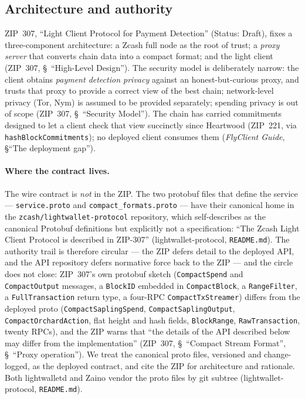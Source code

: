 \documentclass[11pt,a4paper]{article}
\theoremstyle{definition}
\begin{document}
\subsection{Architecture and authority}\label{sec:sync-authority}

ZIP~307, ``Light Client Protocol for Payment Detection'' (Status: Draft),
fixes a three-component architecture: a Zcash full node as the root of
trust; a \emph{proxy server} that converts chain data into a compact
format; and the light client (ZIP~307, \S~``High-Level Design''). The
security model is deliberately narrow: the client obtains \emph{payment
detection privacy} against an honest-but-curious proxy, and trusts that
proxy to provide a correct view of the best chain; network-level privacy
(Tor, Nym) is assumed to be provided separately; spending privacy is out of
scope (ZIP~307, \S~``Security Model''). The chain has carried commitments
designed to let a client check that view succinctly since Heartwood
(ZIP~221, via \texttt{hashBlockCommitments}); no deployed client consumes
them (\emph{FlyClient Guide}, \S``The deployment gap'').

\paragraph{Where the contract lives.} The wire contract is \emph{not} in
the ZIP. The two protobuf files that define the service ---
\texttt{service.proto} and \texttt{compact\_formats.proto} --- have their
canonical home in the \texttt{zcash/lightwallet-protocol} repository, which
self-describes as the canonical Protobuf definitions but explicitly not a
specification: ``The Zcash Light Client Protocol is described in ZIP-307''
(\textsf{lightwallet-protocol}, \texttt{README.md}). The authority trail is
therefore circular --- the ZIP defers detail to the deployed API, and the
API repository defers normative force back to the ZIP --- and the circle
does not close: ZIP~307's own protobuf sketch (\texttt{CompactSpend} and
\texttt{CompactOutput} messages, a \texttt{BlockID} embedded in
\texttt{CompactBlock}, a \texttt{RangeFilter}, a \texttt{FullTransaction}
return type, a four-RPC \texttt{CompactTxStreamer}) differs from the
deployed proto (\texttt{CompactSaplingSpend}, \texttt{CompactSaplingOutput},
\texttt{CompactOrchardAction}, flat height and hash fields,
\texttt{BlockRange}, \texttt{RawTransaction}, twenty RPCs), and the ZIP
warns that ``the details of the API described below may differ from the
implementation'' (ZIP~307, \S~``Compact Stream Format'', \S~``Proxy
operation''). We treat the canonical proto files, versioned and
change-logged, as the deployed contract, and cite the ZIP for architecture
and rationale. Both lightwalletd and Zaino vendor the proto files by git
subtree (\textsf{lightwallet-protocol}, \texttt{README.md}).
\end{document}
